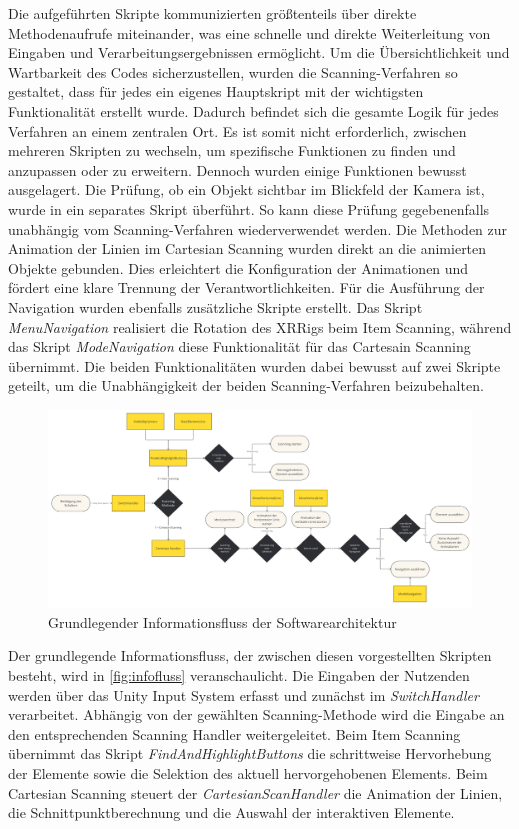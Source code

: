 Die aufgeführten Skripte kommunizierten größtenteils über direkte Methodenaufrufe miteinander, was eine schnelle und direkte Weiterleitung von Eingaben und Verarbeitungsergebnissen ermöglicht. Um die Übersichtlichkeit und Wartbarkeit des Codes sicherzustellen, wurden die Scanning-Verfahren so gestaltet, dass für jedes ein eigenes Hauptskript mit der wichtigsten Funktionalität erstellt wurde. Dadurch befindet sich die gesamte Logik für jedes Verfahren an einem zentralen Ort. Es ist somit nicht erforderlich, zwischen mehreren Skripten zu wechseln, um spezifische Funktionen zu finden und anzupassen oder zu erweitern. Dennoch wurden einige Funktionen bewusst ausgelagert. Die Prüfung, ob ein Objekt sichtbar im Blickfeld der Kamera ist, wurde in ein separates Skript überführt. So kann diese Prüfung gegebenenfalls unabhängig vom Scanning-Verfahren wiederverwendet werden. Die Methoden zur Animation der Linien im Cartesian Scanning wurden direkt an die animierten Objekte gebunden. Dies erleichtert die Konfiguration der Animationen und fördert eine klare Trennung der Verantwortlichkeiten. Für die Ausführung der Navigation wurden ebenfalls zusätzliche Skripte erstellt. Das Skript \textit{MenuNavigation} realisiert die Rotation des XRRigs beim Item Scanning, während das Skript \textit{ModeNavigation} diese Funktionalität für das Cartesain Scanning übernimmt. Die beiden Funktionalitäten wurden dabei bewusst auf zwei Skripte geteilt, um die Unabhängigkeit der beiden Scanning-Verfahren beizubehalten. 

\begin{figure}[tbh]
 \centering
\includegraphics[width=1\textwidth]{images/FlussdiagrammArchitektur.png}
 \caption{Grundlegender Informationsfluss der Softwarearchitektur}
 \label{fig:infofluss}
\end{figure}

Der grundlegende Informationsfluss, der zwischen diesen vorgestellten Skripten besteht, wird in \autoref{fig:infofluss} veranschaulicht. Die Eingaben der Nutzenden werden über das Unity Input System erfasst und zunächst im \textit{SwitchHandler} verarbeitet. Abhängig von der gewählten Scanning-Methode wird die Eingabe an den entsprechenden Scanning Handler weitergeleitet. Beim Item Scanning übernimmt das Skript \textit{FindAndHighlightButtons} die schrittweise Hervorhebung der Elemente sowie die Selektion des aktuell hervorgehobenen Elements. Beim Cartesian Scanning steuert der \textit{CartesianScanHandler} die Animation der Linien, die Schnittpunktberechnung und die Auswahl der interaktiven Elemente.

